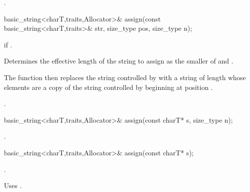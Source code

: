 \begin{itemdescr}
\pnum
\returns
{}.
\end{itemdescr}

%
%
\begin{itemdecl}
basic_string<charT,traits,Allocator>&
  assign(const basic_string<charT,traits>& str, size_type pos,
         size_type n);
\end{itemdecl}

\begin{itemdescr}
\pnum
\requires
{}

\pnum
\throws
{}
if
.

\pnum
\effects
Determines the effective length 
of the string to assign as the smaller of  and
.

The function then replaces the string controlled by  with a
string of length  whose elements are a copy of the string
controlled by  beginning at position .

\pnum
\returns
{}.
\end{itemdescr}

%
%
\begin{itemdecl}
basic_string<charT,traits,Allocator>&
  assign(const charT* s, size_type n);
\end{itemdecl}

\begin{itemdescr}
\pnum
\returns
{}.
\end{itemdescr}

%
%
\begin{itemdecl}
basic_string<charT,traits,Allocator>& assign(const charT* s);
\end{itemdecl}

\begin{itemdescr}
\pnum
\returns
{}.

\pnum
\notes Uses .
\end{itemdescr}

